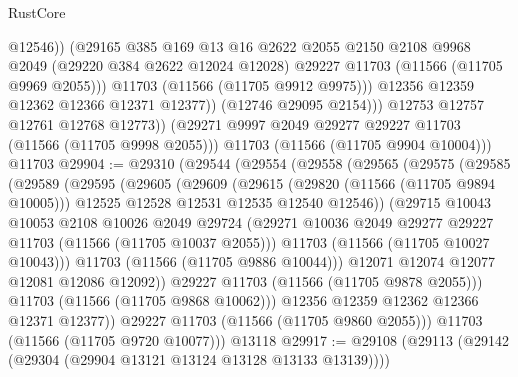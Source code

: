 \begin{lexlean}{RustCore}
\begin{coremodule}
                        @12546))
                    (@29165
                      @385
                      @169
                      @13
                      @16
                      @2622
                      @2055
                      @2150
                      @2108
                      @9968
                      @2049
                      (@29220 @384 @2622 @12024 @12028)
                      @29227
                      @11703
                      (@11566 (@11705 @9969 @2055)))
                    @11703
                    (@11566 (@11705 @9912 @9975)))
                  @12356
                  @12359
                  @12362
                  @12366
                  @12371
                  @12377))
              (@12746 @29095 @2154)))
          @12753
          @12757
          @12761
          @12768
          @12773))
      (@29271 @9997 @2049 @29277 @29227 @11703 (@11566 (@11705 @9998 @2055)))
      @11703
      (@11566 (@11705 @9904 @10004)))
    @11703
@29904 := @29310
    (@29544
      (@29554
        (@29558
          (@29565
            (@29575
              (@29585
                (@29589
                  (@29595
                    (@29605
                      (@29609
                        (@29615
                          (@29820 (@11566 (@11705 @9894 @10005)))
                          @12525
                          @12528
                          @12531
                          @12535
                          @12540
                          @12546))
                      (@29715
                        @10043
                        @10053
                        @2108
                        @10026
                        @2049
                        @29724
                        (@29271 @10036 @2049 @29277 @29227 @11703 (@11566 (@11705 @10037 @2055)))
                        @11703
                        (@11566 (@11705 @10027 @10043)))
                      @11703
                      (@11566 (@11705 @9886 @10044)))
                    @12071
                    @12074
                    @12077
                    @12081
                    @12086
                    @12092))
                @29227
                @11703
                (@11566 (@11705 @9878 @2055)))
              @11703
              (@11566 (@11705 @9868 @10062)))
            @12356
            @12359
            @12362
            @12366
            @12371
            @12377))
        @29227
        @11703
        (@11566 (@11705 @9860 @2055)))
      @11703
      (@11566 (@11705 @9720 @10077)))
    @13118
@29917 := @29108
    (@29113 (@29142 (@29304 (@29904 @13121 @13124 @13128 @13133 @13139))))

\end{coremodule}
\end{lexlean}
